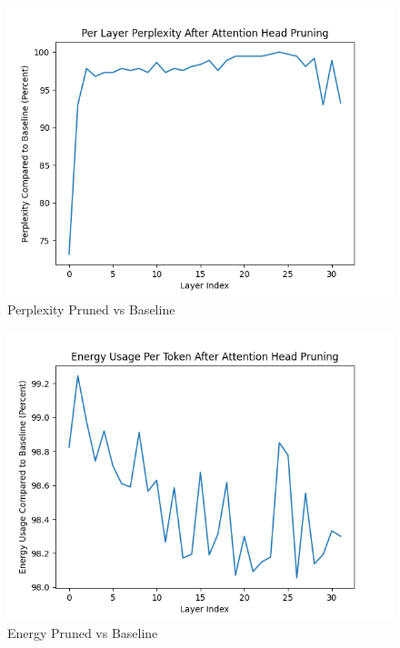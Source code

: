 \documentclass[conference]{IEEEtran}
\begin{document}
    \begin{figure}[!htbp]
        \centerline{\includegraphics[width=1.0\columnwidth]{perplexity}}
        \caption{Perplexity Pruned vs Baseline}
        \label{fig:perplexity}
    \end{figure}

    \begin{figure}[!htbp]
        \centerline{\includegraphics[width=1.0\columnwidth]{energy}}
        \caption{Energy Pruned vs Baseline}
        \label{fig:energy}
    \end{figure}
\end{document}
